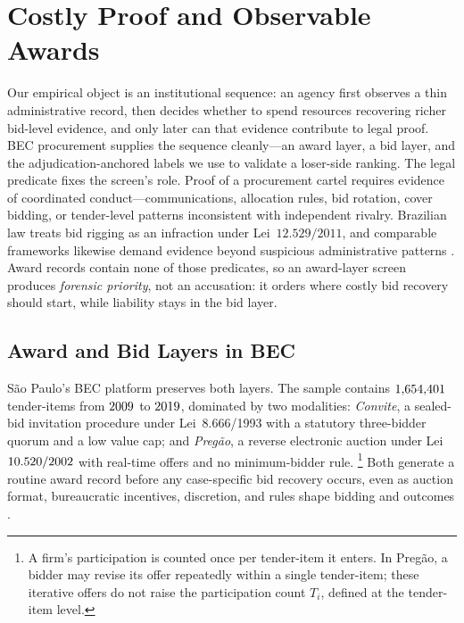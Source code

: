 \section{Costly Proof and Observable Awards}
\label{sec:setting_layers}

%
Our empirical object is an institutional sequence: an agency first
observes a thin administrative record, then decides whether to spend
resources recovering richer bid-level evidence, and only later can that
evidence contribute to legal proof. BEC procurement supplies the
sequence cleanly---an award layer, a bid layer, and the
adjudication-anchored labels we use to validate a loser-side ranking.
The legal predicate fixes the screen's role. Proof of a procurement
cartel requires evidence of coordinated conduct---communications,
allocation rules, bid rotation, cover bidding, or tender-level patterns
inconsistent with independent rivalry. Brazilian law treats bid rigging
as an infraction under Lei~$12.529/2011$, and comparable frameworks
likewise demand evidence beyond suspicious administrative patterns
\citep{hovenkamp2005federal,baker2002case,wils2007leniency,wils2016leniency}.
Award records contain none of those predicates, so an award-layer
screen produces \emph{forensic priority}, not an accusation: it orders
where costly bid recovery should start, while liability stays in the
bid layer.

\subsection{Award and Bid Layers in BEC}
\label{sec:data_layers_bec}

S\~ao Paulo's BEC platform preserves both layers. The sample contains
$1{,}654{,}401$ tender-items from $2009$ to $2019$,
dominated by two modalities: \emph{Convite}, a sealed-bid
invitation procedure under Lei~8.666/1993 with a statutory
three-bidder quorum and a low value cap; and \emph{Preg\~ao}, a
reverse electronic auction under Lei~$10.520/2002$ with
real-time offers and no minimum-bidder rule.%
\footnote{A firm's participation is counted once per tender-item it
enters. In Preg\~ao, a bidder may revise its offer repeatedly within a
single tender-item; these iterative offers do not raise the
participation count \(T_i\), defined at the tender-item level.} Both
generate a routine award record before any case-specific bid recovery
occurs, even as auction format, bureaucratic incentives, discretion,
and rules shape bidding and outcomes
\citep{athey2011comparing,decarolis2014awarding,coviello2017tenure,decarolis2020bureaucratic,decarolis2020rules}.

